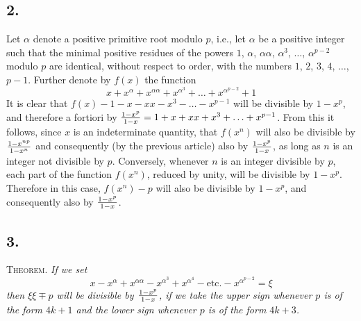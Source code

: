 \documentclass[twoside,12pt]{memoir}
\let\oldfrac\frac
\def\frac#1#2{\mathchoice{\tfrac{#1}{#2}}{\oldfrac{#1}{#2}}{\genfrac{}{}{}{2}{#1}{#2\mathstrut}}{\genfrac{}{}{}{3}{#1}{#2\mathstrut}}}
\begin{document}
\subsection*{2.}

Let \(\alpha\) denote a positive primitive root modulo \(p\), i{.}e{.}, let \(\alpha\) be a positive integer such that the minimal positive residues of the powers \(1\), \(\alpha\), \(\alpha \alpha\), \(\alpha^{3}\), \(\ldots\), \(\alpha^{p-2}\) modulo \(p\) are identical, without respect to order, with the numbers \(1\), \(2\), \(3\), \(4\), \(\ldots\), \(p-1\). Further denote by \(f(x)\) the function
\[x+x^{\alpha}+x^{\alpha \alpha}+x^{\alpha^{3}}+\ldots+x^{\alpha^{p-2}}+1\]
It is clear that \(f(x)-1-x-x x-x^{3}-\ldots-x^{p-1}\) will be divisible by \(1-x^{p}\), and therefore a fortiori by \(\frac{1-x^{p}}{1-x}=1+x+x x+x^{3}+\ldots+x^{p-1}\). From this it follows, since \(x\) is an indeterminate quantity, that \(f(x^{n})\) will also be divisible by \(\frac{1-x^{n p}}{1-x^{n}}\) and consequently (by the previous article) also by \(\frac{1-x^{p}}{1-x}\), as long as \(n\) is an integer not divisible by \(p\). Conversely, whenever \(n\) is an integer divisible by \(p\), each part of the function \(f(x^{n})\), reduced by unity, \pagebreak%
will be divisible by \(1-x^{p}\). Therefore in this case, \(f(x^{n})-p\) will also be divisible by \(1-x^{p}\), and consequently also by \(\frac{1-x^{p}}{1-x}\).

\subsection*{3.}

\textsc{Theorem.} \textit{If we set}
\[x-x^{\alpha}+x^{\alpha \alpha}-x^{\alpha^{3}}+x^{\alpha^{4}}-\text{etc{.}}-x^{\alpha^{p-2}}=\xi\]
\textit{then \(\xi \xi \mp p\) will be divisible by \(\frac{1-x^{p}}{1- x}\), if we take the upper sign whenever \(p\) is of the form \(4k+1\) and the lower sign whenever \(p\) is of the form \(4k+3\).}
\end{document}
